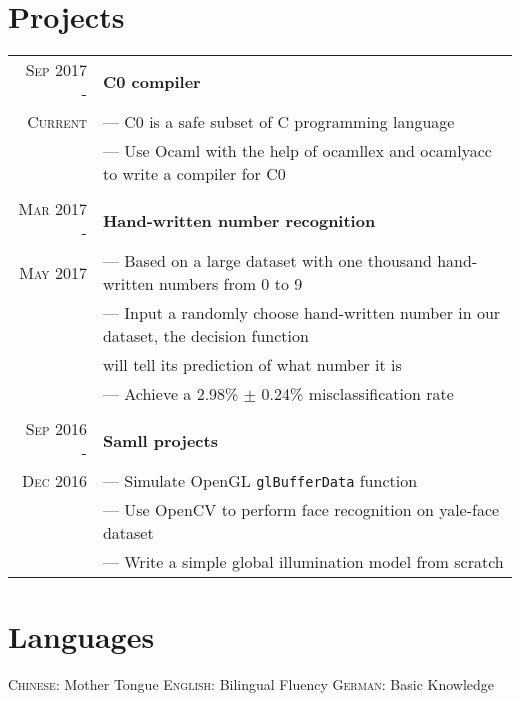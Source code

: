\documentclass[a4paper,10pt]{article}
\begin{document}
	\section{Projects}
	\begin{tabular}{r | l}
	    \textsc{Sep 2017 - } & \textbf{C0 compiler} \\\textsc{Current}& --- C0 is a safe subset of C programming language
	    \\& --- Use Ocaml with the help of ocamllex and ocamlyacc to write a compiler for C0
		\\ \multicolumn{1}{c}{} \\
		\textsc{Mar 2017 - } & \textbf{Hand-written number recognition} \\\textsc{May 2017}& --- Based on a large dataset with one thousand hand-written numbers from 0 to 9
		\\& --- Input a randomly choose hand-written number in our dataset, the decision function  
		\\& will tell its prediction of what number it is
		\\& --- Achieve a 2.98\% $\pm$ 0.24\% misclassification rate
		\\ \multicolumn{1}{c}{} \\
		\textsc{Sep 2016 - } & \textbf{Samll projects} 
		\\\textsc{Dec 2016}& --- Simulate OpenGL \texttt{glBufferData} function
		\\& --- Use OpenCV to perform face recognition on yale-face dataset
		\\& --- Write a simple global illumination model from scratch
	\end{tabular}
	
	\section{Languages}
		\textsc{Chinese:} Mother Tongue \quad \quad
		\textsc{English:} Bilingual Fluency \quad \quad
		\textsc{German:} Basic Knowledge \quad \quad
	
\end{document}

